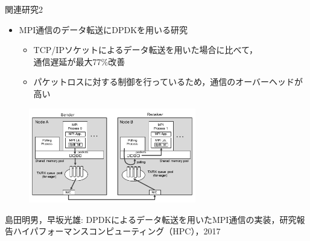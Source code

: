 \documentclass[12pt, unicode]{beamer}
\begin{document}
\begin{frame}{関連研究2}
  \begin{itemize}
    \item MPI通信のデータ転送にDPDKを用いる研究
    \begin{itemize}
      \item TCP/IPソケットによるデータ転送を用いた場合に比べて，\\通信遅延が最大77\%改善
      \item パケットロスに対する制御を行っているため，通信のオーバーヘッドが高い
    \end{itemize}
  \end{itemize}

  \begin{figure}[h]
    \centering
    \includegraphics[width=0.65\textwidth]{pictures/RelatedWorkTwo.pdf}
  \end{figure}

  \scriptsize{島田明男，早坂光雄: DPDKによるデータ転送を用いたMPI通信の実装，研究報告ハイパフォーマンスコンピューティング（HPC），2017}
\end{frame}
\end{document}
